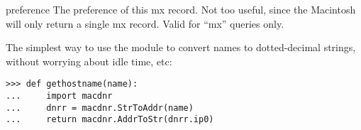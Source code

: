 \begin{datadesc}{preference}
The preference of this mx record.  Not too useful, since the Macintosh
will only return a single mx record.  Valid for ``mx'' queries only.
\end{datadesc}

The simplest way to use the module to convert names to dotted-decimal
strings, without worrying about idle time, etc:
\begin{verbatim}
>>> def gethostname(name):
...     import macdnr
...     dnrr = macdnr.StrToAddr(name)
...     return macdnr.AddrToStr(dnrr.ip0)
\end{verbatim}
